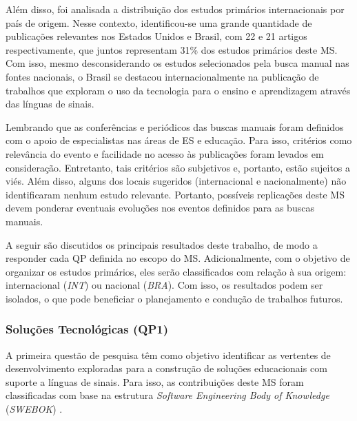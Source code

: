 Além disso, foi analisada a distribuição dos estudos primários internacionais por país de origem. Nesse contexto, identificou-se uma grande quantidade de publicações relevantes nos Estados Unidos e Brasil, com 22 e 21 artigos respectivamente, que juntos representam 31\% dos estudos primários deste MS. Com isso, mesmo desconsiderando os estudos selecionados pela busca manual nas fontes nacionais, o Brasil se destacou internacionalmente na publicação de trabalhos que exploram o uso da tecnologia para o ensino e aprendizagem através das línguas de sinais.

Lembrando que as conferências e periódicos das buscas manuais foram definidos com o apoio de especialistas nas áreas de ES e educação. Para isso, critérios como relevância do evento e facilidade no acesso às publicações foram levados em consideração. Entretanto, tais critérios são subjetivos e, portanto, estão sujeitos a viés. Além disso, alguns dos locais sugeridos (internacional e nacionalmente) não identificaram nenhum estudo relevante. Portanto, possíveis replicações deste MS devem ponderar eventuais evoluções nos eventos definidos para as buscas manuais.

A seguir são discutidos os principais resultados deste trabalho, de modo a responder cada QP definida no escopo do MS. Adicionalmente, com o objetivo de organizar os estudos primários, eles serão classificados com relação à sua origem: internacional (\textit{INT}) ou nacional (\textit{BRA}). Com isso, os resultados podem ser isolados, o que pode beneficiar o planejamento e condução de trabalhos futuros.

\subsubsection{Soluções Tecnológicas (QP1)}


A primeira questão de pesquisa têm como objetivo identificar as vertentes de desenvolvimento exploradas para a construção de soluções educacionais com suporte a línguas de sinais. Para isso, as contribuições deste MS foram classificadas com base na estrutura \textit{Software Engineering Body of Knowledge} (\textit{SWEBOK}) \cite{Bourque2014, Petersen2015}.


